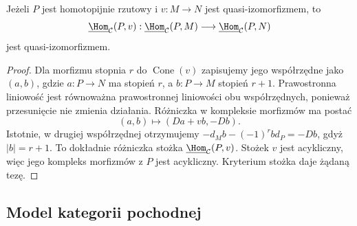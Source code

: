 \begin{stwierdzenie}\label{cat:prop:dg-h-projective-qiso}
Jeżeli $P$ jest homotopijnie rzutowy i $v:M\to N$ jest quasi-izomorfizmem, to
\[
 \underline{\Hom}_{\mathcal C}(P,v):
 \underline{\Hom}_{\mathcal C}(P,M)
 \longrightarrow\underline{\Hom}_{\mathcal C}(P,N)
\]
jest quasi-izomorfizmem.
\end{stwierdzenie}
\begin{proof}
Dla morfizmu stopnia $r$ do $\operatorname{Cone}(v)$ zapisujemy jego współrzędne jako $(a,b)$, gdzie $a:P\to N$ ma stopień $r$, a $b:P\to M$ stopień $r+1$. Prawostronna liniowość jest równoważna prawostronnej liniowości obu współrzędnych, ponieważ przesunięcie nie zmienia działania. Różniczka w kompleksie morfizmów ma postać
\[
 (a,b)\longmapsto(Da+vb,-Db).
\]
Istotnie, w drugiej współrzędnej otrzymujemy $-d_Mb-(-1)^rb d_P=-Db$, gdyż $|b|=r+1$. To dokładnie różniczka stożka $\underline{\Hom}_{\mathcal C}(P,v)$. Stożek $v$ jest acykliczny, więc jego kompleks morfizmów z $P$ jest acykliczny. Kryterium stożka daje żądaną tezę.
\end{proof}

\subsection{Model kategorii pochodnej}

